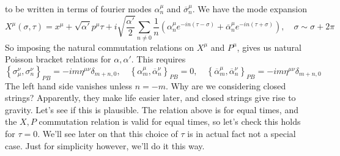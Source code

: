 \documentclass[11pt, oneside]{article}   	%
\theoremstyle{slanted}
\begin{document}
to be written in terms of fourier modes $ \alpha^ \mu _ n  $
and $ \overline{ \sigma } ^ \mu _ n $. 
We have the 
mode expansion 
\[
X^ \mu \left( \sigma, \tau  \right)   = x ^ \mu 
+ \sqrt{ \alpha  ' }  p ^ \mu \tau  +  i \sqrt{ \frac{\alpha ' }{ 2 } }  
\sum_{ n \neq 0 } \frac{1}{n } \left( 
\alpha ^ \mu _ n e ^{   -in \left( \tau  - \sigma  \right)  } + 
\overline{ \alpha } ^ \mu _ n e ^{  - in \left( \tau + \sigma  \right)  } \right) , 
\quad \sigma \sim \sigma + 2 \pi 
\]  So imposing 
the natural commutation relations on 
$ X ^ \mu $ and $ P ^ \mu $, gives 
us natural Poisson bracket relations 
for $ \alpha , \alpha ' $. 
This requires 
\[
\left\{  \sigma _ \mu ^ \nu , \sigma _ n ^ \nu  \right\}  _{ P B } 
= - i m \eta ^{ \mu \nu } \delta _{ m + n , 0 }, \quad 
\left\{  \alpha ^ \mu _ m , \overline{ \alpha } ^ \nu _ n  \right\}  _{ P B }  = 0 , \quad 
\left\{  \overline{ \alpha } ^ \mu _ m , \overline{ \alpha } ^ \nu _ n  \right\}  _{ P B } 
=   - i m \eta ^{ \mu \nu } \delta _{ m + n , 0 }
\] The left hand side 
vanishes unless $ n  =- m $. Why are we considering closed strings? 
Apparently, they make life easier later, 
and closed strings give rise to gravity. 
Let's see if this is plausible. 
The relation above is for equal times, 
and the $ X , P $ commutation relation 
is valid for equal times, 
so let's check this holds for $ \tau  = 0$. 
We'll see later on that this 
choice of $ \tau $ is in actual fact not a special case. 
Just for simplicity however, we'll do it this way. 
\end{document}
